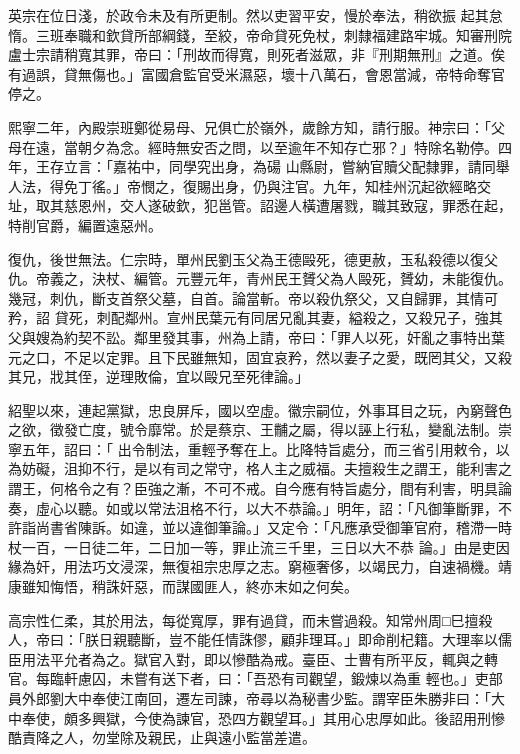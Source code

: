 \begin{pinyinscope}
 英宗在位日淺，於政令未及有所更制。然以吏習平安，慢於奉法，稍欲振
 起其怠惰。三班奉職和欽貸所部綱錢，至絞，帝命貸死免杖，刺隸福建路牢城。知審刑院盧士宗請稍寬其罪，帝曰：「刑故而得寬，則死者滋眾，非『刑期無刑』之道。俟有過誤，貸無傷也。」富國倉監官受米濕惡，壞十八萬石，會恩當減，帝特命奪官停之。



 熙寧二年，內殿崇班鄭從易母、兄俱亡於嶺外，歲餘方知，請行服。神宗曰：「父母在遠，當朝夕為念。經時無安否之問，以至逾年不知存亡邪？」特除名勒停。四年，王存立言：「嘉祐中，同學究出身，為碭
 山縣尉，嘗納官贖父配隸罪，請同舉人法，得免丁徭。」帝憫之，復賜出身，仍與注官。九年，知桂州沉起欲經略交址，取其慈恩州，交人遂破欽，犯邕管。詔邊人橫遭屠戮，職其致寇，罪悉在起，特削官爵，編置遠惡州。



 復仇，後世無法。仁宗時，單州民劉玉父為王德毆死，德更赦，玉私殺德以復父仇。帝義之，決杖、編管。元豐元年，青州民王贇父為人毆死，贇幼，未能復仇。幾冠，刺仇，斷支首祭父墓，自首。論當斬。帝以殺仇祭父，又自歸罪，其情可矜，詔
 貸死，刺配鄰州。宣州民葉元有同居兄亂其妻，縊殺之，又殺兄子，強其父與嫂為約契不訟。鄰里發其事，州為上請，帝曰：「罪人以死，奸亂之事特出葉元之口，不足以定罪。且下民雖無知，固宜哀矜，然以妻子之愛，既罔其父，又殺其兄，戕其侄，逆理敗倫，宜以毆兄至死律論。」



 紹聖以來，連起黨獄，忠良屏斥，國以空虛。徽宗嗣位，外事耳目之玩，內窮聲色之欲，徵發亡度，號令靡常。於是蔡京、王黼之屬，得以誣上行私，變亂法制。崇寧五年，詔曰：「
 出令制法，重輕予奪在上。比降特旨處分，而三省引用敕令，以為妨礙，沮抑不行，是以有司之常守，格人主之威福。夫擅殺生之謂王，能利害之謂王，何格令之有？臣強之漸，不可不戒。自今應有特旨處分，間有利害，明具論奏，虛心以聽。如或以常法沮格不行，以大不恭論。」明年，詔：「凡御筆斷罪，不許詣尚書省陳訴。如違，並以違御筆論。」又定令：「凡應承受御筆官府，稽滯一時杖一百，一日徒二年，二日加一等，罪止流三千里，三日以大不恭
 論。」由是吏因緣為奸，用法巧文浸深，無復祖宗忠厚之志。窮極奢侈，以竭民力，自速禍機。靖康雖知悔悟，稍誅奸惡，而謀國匪人，終亦末如之何矣。



 高宗性仁柔，其於用法，每從寬厚，罪有過貸，而未嘗過殺。知常州周□巳擅殺人，帝曰：「朕日親聽斷，豈不能任情誅僇，顧非理耳。」即命削杞籍。大理率以儒臣用法平允者為之。獄官入對，即以慘酷為戒。臺臣、士曹有所平反，輒與之轉官。每臨軒慮囚，未嘗有送下者，曰：「吾恐有司觀望，鍛煉以為重
 輕也。」吏部員外郎劉大中奉使江南回，遷左司諫，帝尋以為秘書少監。謂宰臣朱勝非曰：「大中奉使，頗多興獄，今使為諫官，恐四方觀望耳。」其用心忠厚如此。後詔用刑慘酷責降之人，勿堂除及親民，止與遠小監當差遣。




\end{pinyinscope}
